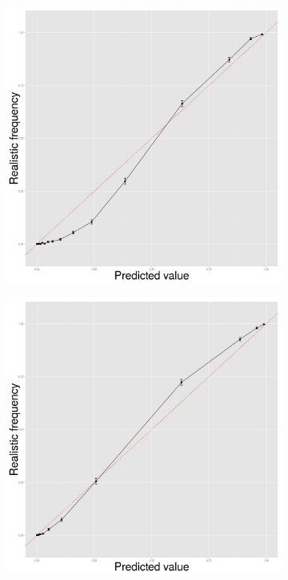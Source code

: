 \begin{figure}[t]
\begin{subfigure}{0.32\textwidth}
  \centering
  \includegraphics[width=\linewidth]{pos_hmm.jpg}
  \caption{}
\end{subfigure}
\begin{subfigure}{0.32\textwidth}
  \centering
  \includegraphics[width=\linewidth]{pos_crf.jpg}

\end{subfigure}
\end{figure}
